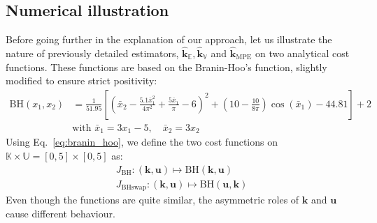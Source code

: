 \documentclass[preprint, 1p]{elsarticle}
\newcommand{\Ex}{\mathbb{E}}
\newcommand{\hatkmean}{\hat{\mathbf{k}}_{\Ex}}
\newcommand{\hatkvar}{\hat{\mathbf{k}}_{\mathbb{V}}}
\newcommand{\hatkmpe}{\hat{\mathbf{k}}_{\mathrm{MPE}}}
\newcommand{\Kspace}{\mathbb{K}}
\newcommand{\Uspace}{\mathbb{U}}
\begin{document}
\subsection{Numerical illustration}
\label{ssec:num_illu}
Before going further in the explanation of our approach, let us illustrate the nature of previously detailed estimators, $\hatkmean, \hatkvar$ and $\hatkmpe$ on two analytical cost functions. These functions are based on the Branin-Hoo's function, slightly modified to ensure strict positivity:
\begin{align}
  \label{eq:branin_hoo}
 \mathrm{BH}(x_1,x_2) &= \frac{1}{51.95}\left[\left(\bar{x}_2 - \frac{5.1 \bar{x}_1^2}{4\pi^2} + \frac{5\bar{x}_1}{\pi} -6 \right)^2 + \left(10 - \frac{10}{8\pi}\right)\cos(\bar{x}_1)-44.81\right]+2\\
&\text{with } \bar{x}_1 = 3x_1-5,\quad \bar{x}_2 = 3x_2
\end{align}
%
Using Eq.~\eqref{eq:branin_hoo}, we define the two cost functions on $\Kspace \times \Uspace = [0,5] \times [0,5]$ as:
\begin{align*} J_{\mathrm{BH}} : (\mathbf{k},\mathbf{u}) \mapsto \mathrm{BH}(\mathbf{k},\mathbf{u}) \\
J_{\mathrm{BHswap}} : (\mathbf{k},\mathbf{u}) \mapsto \mathrm{BH}(\mathbf{u},\mathbf{k})
\end{align*}
Even though the functions are quite similar, the asymmetric roles of $\mathbf{k}$ and $\mathbf{u}$ cause different behaviour.
\end{document}
